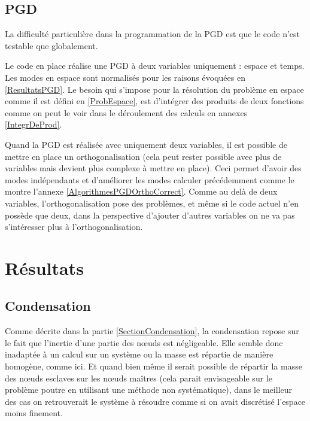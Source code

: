 \documentclass[12pt,a4paper]{report}
\begin{document}
\section{PGD}
La difficulté particulière dans la programmation de la PGD est que le code n'est testable que globalement. 

Le code en place réalise une PGD à deux variables uniquement : espace et temps. Les modes en espace sont normalisés pour les raisons évoquées en \ref{ResultatsPGD}. Le besoin qui s'impose pour la résolution du problème en espace comme il est défini en \ref{ProbEspace}, est d'intégrer des produits de deux fonctions comme on peut le voir dans le déroulement des calculs en annexes \ref{IntegrDeProd}.

Quand la PGD est réalisée avec uniquement deux variables, il est possible de mettre en place un orthogonalisation (cela peut rester possible avec plus de variables mais devient plus complexe à mettre en place). Ceci permet d'avoir des modes indépendants et d'améliorer les modes calculer précédemment comme le montre l'annexe \ref{AlgorithmesPGDOrthoCorrect}. Comme au delà de deux variables, l'orthogonalisation pose des problèmes, et même si le code actuel n'en possède que deux, dans la perspective d'ajouter d'autres variables on ne va pas s'intéresser plus à l'orthogonalisation.



\chapter{Résultats}

\section{Condensation}
Comme décrite dans la partie \ref{SectionCondensation}, la condensation repose sur le fait que l'inertie d'une partie des nœuds est négligeable. Elle semble donc inadaptée à un calcul sur un système ou la masse est répartie de manière homogène, comme ici. Et quand bien même il serait possible de répartir la masse des nœuds esclaves sur les nœuds maîtres (cela parait envisageable sur le problème poutre en utilisant une méthode non systématique), dans le meilleur des cas on retrouverait le système à résoudre comme si on avait discrétisé l'espace moins finement.
\end{document}

